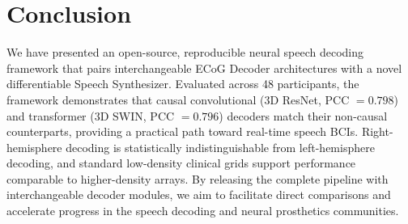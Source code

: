 \documentclass[10pt]{article}
\begin{document}
\section{Conclusion}

We have presented an open-source, reproducible neural speech decoding framework that pairs interchangeable ECoG Decoder architectures with a novel differentiable Speech Synthesizer. Evaluated across 48 participants, the framework demonstrates that causal convolutional (3D ResNet, PCC $=0.798$) and transformer (3D SWIN, PCC $=0.796$) decoders match their non-causal counterparts, providing a practical path toward real-time speech BCIs. Right-hemisphere decoding is statistically indistinguishable from left-hemisphere decoding, and standard low-density clinical grids support performance comparable to higher-density arrays. By releasing the complete pipeline with interchangeable decoder modules, we aim to facilitate direct comparisons and accelerate progress in the speech decoding and neural prosthetics communities.



\end{document}
